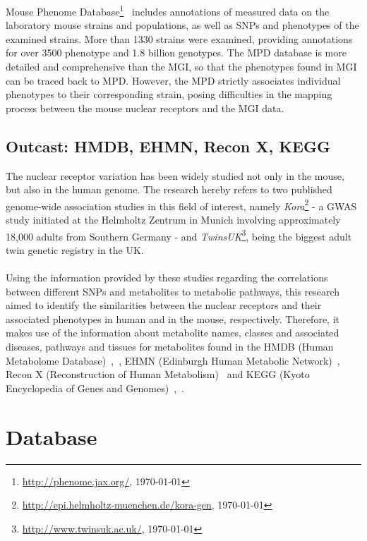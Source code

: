 \documentclass[fleqn,11pt]{SelfArx}
\begin{document}
Mouse Phenome Database\footnote{\url{http://phenome.jax.org/}, \today}~\cite{mpd} includes annotations of measured data on the laboratory mouse strains and populations, as well as SNPs and phenotypes of the examined strains. More than 1330 strains were examined, providing annotations for over 3500 phenotype and 1.8 billion genotypes. The MPD database is more detailed and comprehensive than the MGI, so that the phenotypes found in MGI can be traced back to MPD. However, the MPD strictly associates individual phenotypes to their corresponding strain, posing difficulties in the mapping process between the mouse nuclear receptors and the MGI data. 

\subsection{Outcast: HMDB, EHMN, Recon X, KEGG}
The nuclear receptor variation has been widely studied not only in the mouse, but also in the human genome. The research hereby refers to two published genome-wide association studies in this field of interest, namely \textit{Kora}\footnote{\url{http://epi.helmholtz-muenchen.de/kora-gen}, \today}  - a GWAS study initiated at the Helmholtz Zentrum in Munich involving approximately 18,000 adults from Southern Germany - and \textit{TwinsUK}\footnote{\url{http://www.twinsuk.ac.uk/}, \today}, being the biggest adult twin genetic registry in the UK.  
~~~~~~~\\
~~~~~~~\\
Using the information provided by these studies regarding the correlations between different SNPs and metabolites to metabolic pathways, this research aimed to identify the similarities between the nuclear receptors and their associated phenotypes in human and in the mouse, respectively.  Therefore, it makes use of the information about metabolite names, classes and associated diseases, pathways and tissues for metabolites found in the HMDB (Human Metabolome Database)~\cite{hm1},~\cite{hm2}, EHMN (Edinburgh Human Metabolic Network)~\cite{hm3}, Recon X (Reconstruction of Human Metabolism)~\cite{hm4} and KEGG (Kyoto Encyclopedia of Genes and Genomes)~\cite{hm5},~\cite{hm6}. 


\section{Database}
\end{document}

